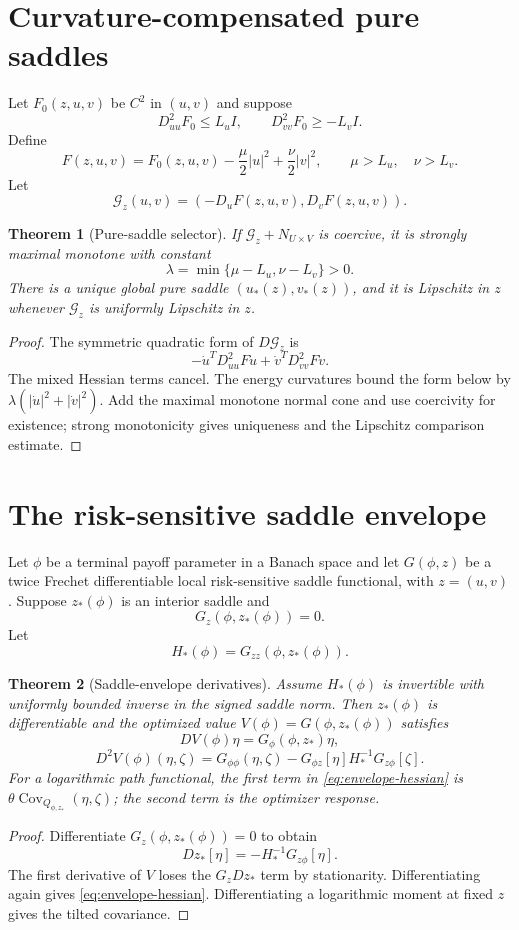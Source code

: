 \documentclass[11pt,reqno]{amsart}
\newtheorem{theorem}{Theorem}[section]
\theoremstyle{definition}
\theoremstyle{remark}
\newcommand{\Cov}{\operatorname{Cov}}
\newcommand{\abs}[1]{\left\lvert #1\right\rvert}
\begin{document}
\section{Curvature-compensated pure saddles}\label{sec:curvature}
Let $F_0(z,u,v)$ be $C^2$ in $(u,v)$ and suppose
\[
 D_{uu}^2F_0\le L_uI,
 \qquad
 D_{vv}^2F_0\ge-L_vI.
\]
Define
\[
 F(z,u,v)=F_0(z,u,v)-\frac\mu2\abs u^2+\frac\nu2\abs v^2,
 \qquad \mu>L_u,\quad\nu>L_v.
\]
Let
\[
 \mathscr G_z(u,v)=(-D_uF(z,u,v),D_vF(z,u,v)).
\]

\begin{theorem}[Pure-saddle selector]\label{thm:saddle}
If $\mathscr G_z+N_{U\times V}$ is coercive, it is strongly maximal monotone
with constant
\[
 \lambda=\min\{\mu-L_u,\nu-L_v\}>0.
\]
There is a unique global pure saddle $(u_*(z),v_*(z))$, and it is Lipschitz in
$z$ whenever $\mathscr G_z$ is uniformly Lipschitz in $z$.
\end{theorem}
\begin{proof}
The symmetric quadratic form of $D\mathscr G_z$ is
\[
 -\dot u^TD_{uu}^2F\dot u+\dot v^TD_{vv}^2F\dot v.
\]
The mixed Hessian terms cancel.  The energy curvatures bound the form below by
$\lambda(\abs{\dot u}^2+\abs{\dot v}^2)$.  Add the maximal monotone normal cone
and use coercivity for existence; strong monotonicity gives uniqueness and the
Lipschitz comparison estimate.
\end{proof}

\section{The risk-sensitive saddle envelope}\label{sec:envelope}
Let $\phi$ be a terminal payoff parameter in a Banach space and let
$G(\phi,z)$ be a twice Frechet differentiable local risk-sensitive saddle
functional, with $z=(u,v)$.  Suppose $z_*(\phi)$ is an interior saddle and
\[
 G_z(\phi,z_*(\phi))=0.
\]
Let
\[
 H_*(\phi)=G_{zz}(\phi,z_*(\phi)).
\]

\begin{theorem}[Saddle-envelope derivatives]\label{thm:envelope}
Assume $H_*(\phi)$ is invertible with uniformly bounded inverse in the signed
saddle norm.  Then $z_*(\phi)$ is differentiable and the optimized value
$V(\phi)=G(\phi,z_*(\phi))$ satisfies
\[
 DV(\phi)\eta=G_\phi(\phi,z_*)\eta,
\]
\begin{equation}\label{eq:envelope-hessian}
 D^2V(\phi)(\eta,\zeta)
 =G_{\phi\phi}(\eta,\zeta)
 -G_{\phi z}[\eta]H_*^{-1}G_{z\phi}[\zeta].
\end{equation}
For a logarithmic path functional, the first term in
\eqref{eq:envelope-hessian} is
$\theta\Cov_{Q_{\phi,z_*}}(\eta,\zeta)$; the second term is the optimizer
response.
\end{theorem}
\begin{proof}
Differentiate $G_z(\phi,z_*(\phi))=0$ to obtain
\[
 Dz_*[\eta]=-H_*^{-1}G_{z\phi}[\eta].
\]
The first derivative of $V$ loses the $G_zDz_*$ term by stationarity.
Differentiating again gives \eqref{eq:envelope-hessian}.  Differentiating a
logarithmic moment at fixed $z$ gives the tilted covariance.
\end{proof}
\end{document}
